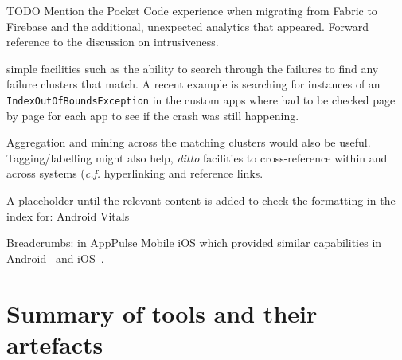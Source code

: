 TODO Mention the Pocket Code experience when migrating from Fabric to Firebase and the additional, unexpected analytics that appeared. Forward reference to the discussion on intrusiveness.

\itools {} simple facilities such as the ability to search through the failures to find any failure clusters that match. A recent example is searching for instances of an \texttt{IndexOutOfBoundsException} in the  custom apps where  had to be checked page by page for each app to see if the crash was still happening.

Aggregation and mining across the matching clusters would also be useful. Tagging/labelling might also help, \emph{ditto} facilities to cross-reference within and across systems (\emph{c.f.} hyperlinking and reference links.

A placeholder until the relevant content is added to check the formatting in the index for: Android Vitals

Breadcrumbs: in AppPulse Mobile iOS which provided similar capabilities in Android~ and iOS~.

\section{Summary of tools and their artefacts}~\label{tata-summary-section}
